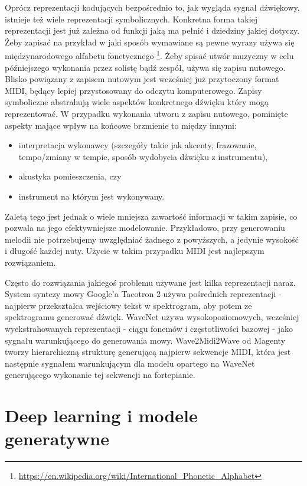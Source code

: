 \documentclass[magisterska]{pracamgr}
\begin{document}
Oprócz reprezentacji kodujących bezpośrednio to, jak wygląda sygnał dźwiękowy, istnieje też wiele reprezentacji symbolicznych. Konkretna forma takiej reprezentacji jest już zależna od funkcji jaką ma pełnić i dziedziny jakiej dotyczy. Żeby zapisać na przykład w jaki sposób wymawiane są pewne wyrazy używa się międzynarodowego alfabetu fonetycznego \footnote{\url{https://en.wikipedia.org/wiki/International_Phonetic_Alphabet}}. Żeby spisać utwór muzyczny w celu późniejszego wykonania przez solistę bądź zespół, używa się zapisu nutowego. Blisko powiązany z zapisem nutowym jest wcześniej już przytoczony format MIDI, będący lepiej przystosowany do odczytu komputerowego. Zapisy symboliczne abstrahują wiele aspektów konkretnego dźwięku który mogą reprezentować. W przypadku wykonania utworu z zapisu nutowego, pominięte aspekty mające wpływ na końcowe brzmienie to między innymi:
\begin{itemize}
    \setlength\itemsep{0em}
    \item interpretacja wykonawcy (szczegóły takie jak akcenty, frazowanie, tempo/zmiany w tempie, sposób wydobycia dźwięku z instrumentu),
    \item akustyka pomieszczenia, czy
    \item instrument na którym jest wykonywany.
\end{itemize}
Zaletą tego jest jednak o wiele mniejsza zawartość informacji w takim zapisie, co pozwala na jego efektywniejsze modelowanie. Przykładowo, przy generowaniu melodii nie potrzebujemy uwzględniać żadnego z powyższych, a jedynie wysokość i długość każdej nuty. Użycie w takim przypadku MIDI jest najlepszym rozwiązaniem.

Często do rozwiązania jakiegoś problemu używane jest kilka reprezentacji naraz. System syntezy mowy Google'a Tacotron 2 \cite{shen2018natural} używa pośrednich reprezentacji - najpierw przekształca wejściowy tekst w spektrogram, aby potem ze spektrogramu generować dźwięk. WaveNet \cite{oord2016wavenet} używa wysokopoziomowych, wcześniej wyekstrahowanych reprezentacji - ciągu fonemów i częstotliwości bazowej - jako sygnału warunkującego do generowania mowy. Wave2Midi2Wave od Magenty \cite{hawthorne2019maestro} tworzy hierarchiczną strukturę generującą najpierw sekwencje MIDI, która jest następnie sygnałem warunkującym dla modelu opartego na WaveNet generującego wykonanie tej sekwencji na fortepianie.

\section{Deep learning i modele generatywne}
\end{document}
